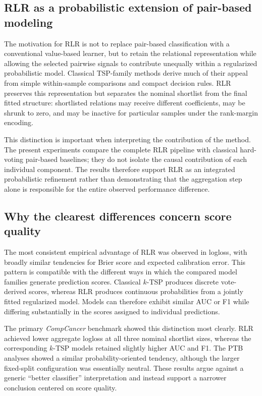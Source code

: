 \documentclass[journal]{IEEEtran}
\begin{document}
\subsection{RLR as a probabilistic extension of pair-based modeling}

The motivation for RLR is not to replace pair-based classification with a conventional value-based learner, but to retain the relational representation while allowing the selected pairwise signals to contribute unequally within a regularized probabilistic model. Classical TSP-family methods derive much of their appeal from simple within-sample comparisons and compact decision rules. RLR preserves this representation but separates the nominal shortlist from the final fitted structure: shortlisted relations may receive different coefficients, may be shrunk to zero, and may be inactive for particular samples under the rank-margin encoding.

This distinction is important when interpreting the contribution of the method. The present experiments compare the complete RLR pipeline with classical hard-voting pair-based baselines; they do not isolate the causal contribution of each individual component. The results therefore support RLR as an integrated probabilistic refinement rather than demonstrating that the aggregation step alone is responsible for the entire observed performance difference.

\subsection{Why the clearest differences concern score quality}

The most consistent empirical advantage of RLR was observed in logloss, with broadly similar tendencies for Brier score and expected calibration error. This pattern is compatible with the different ways in which the compared model families generate prediction scores. Classical $k$-TSP produces discrete vote-derived scores, whereas RLR produces continuous probabilities from a jointly fitted regularized model. Models can therefore exhibit similar AUC or F1 while differing substantially in the scores assigned to individual predictions.

The primary \emph{CompCancer} benchmark showed this distinction most clearly. RLR achieved lower aggregate logloss at all three nominal shortlist sizes, whereas the corresponding $k$-TSP models retained slightly higher AUC and F1. The PTB analyses showed a similar probability-oriented tendency, although the larger fixed-split configuration was essentially neutral. These results argue against a generic ``better classifier'' interpretation and instead support a narrower conclusion centered on score quality.
\end{document}
